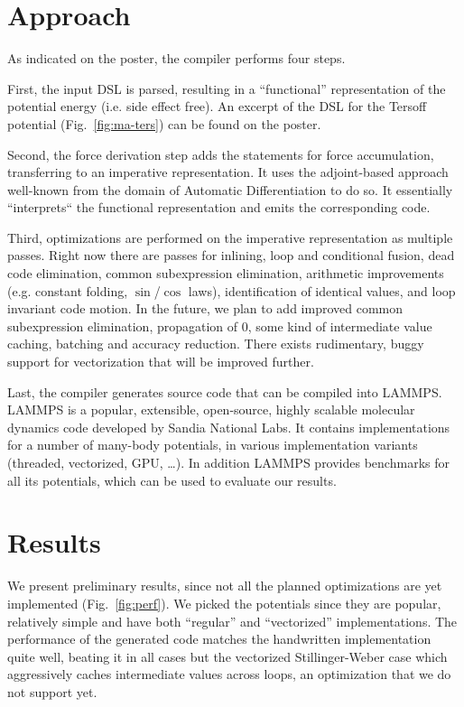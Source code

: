 \documentclass[sigconf]{acmart}
\begin{document}
\section{Approach}

As indicated on the poster, the compiler performs four steps.

First, the input DSL is parsed, resulting in a ``functional'' representation of the potential energy (i.e. side effect free).
An excerpt of the DSL for the Tersoff potential (Fig.~\ref{fig:ma-ters}) can be found on the poster.

Second, the force derivation step adds the statements for force accumulation, transferring to an imperative representation.
It uses the adjoint-based approach well-known from the domain of Automatic Differentiation to do so.
It essentially ``interprets`` the functional representation and emits the corresponding code.

Third, optimizations are performed on the imperative representation as multiple passes.
Right now there are passes for inlining, loop and conditional fusion, dead code elimination, common subexpression elimination, arithmetic improvements (e.g. constant folding, $\sin$/$\cos$ laws), identification of identical values, and loop invariant code motion.
In the future, we plan to add improved common subexpression elimination, propagation of $0$, some kind of intermediate value caching, batching and accuracy reduction.
There exists rudimentary, buggy support for vectorization that will be improved further.

Last, the compiler generates source code that can be compiled into LAMMPS.
LAMMPS is a popular, extensible, open-source, highly scalable molecular dynamics code developed by Sandia National Labs.
It contains implementations for a number of many-body potentials, in various implementation variants (threaded, vectorized, GPU, \dots).
In addition LAMMPS provides benchmarks for all its potentials, which can be used to evaluate our results.

\section{Results}

We present preliminary results, since not all the planned optimizations are yet implemented (Fig.~\ref{fig:perf}).
We picked the potentials since they are popular, relatively simple and have both ``regular'' and ``vectorized'' implementations.
The performance of the generated code matches the handwritten implementation quite well, beating it in all cases but the vectorized Stillinger-Weber case which aggressively caches intermediate values across loops, an optimization that we do not support yet.
\end{document}
